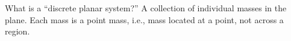 {What is a ``discrete planar system?''
}
{A collection of individual masses in the plane. Each mass is a point mass, i.e., mass located at a point, not across a region.
}